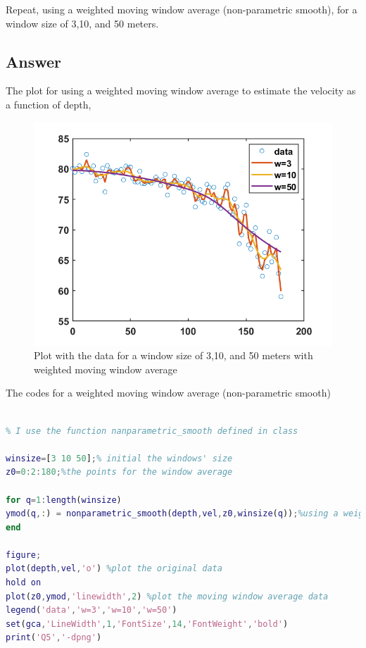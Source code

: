 \documentclass[
	12pt, %
]{fphw}
\begin{document}
\begin{problem}
Repeat, using a weighted moving window average (non-parametric smooth), for a window size of 3,10, and
50 meters.

\end{problem}


\subsection*{Answer}

The plot for using a weighted moving window average to estimate the velocity as a function of depth,

\begin{figure}[htbp]
	\centering
	\includegraphics[width=0.8\columnwidth]{Q5.png} 
	\caption{Plot with the data for a
		window size of 3,10, and 50 meters with weighted moving window average}
\end{figure}

The codes for  a weighted moving window average (non-parametric smooth)

\begin{lstlisting}[language=Matlab,escapeinside=``]

% I use the function nanparametric_smooth defined in class

winsize=[3 10 50];% initial the windows' size
z0=0:2:180;%the points for the window average

for q=1:length(winsize)   
ymod(q,:) = nonparametric_smooth(depth,vel,z0,winsize(q));%using a weighted moving window average
end

figure; 
plot(depth,vel,'o') %plot the original data
hold on
plot(z0,ymod,'linewidth',2) %plot the moving window average data
legend('data','w=3','w=10','w=50')
set(gca,'LineWidth',1,'FontSize',14,'FontWeight','bold')
print('Q5','-dpng')
\end{lstlisting}
\end{document}

